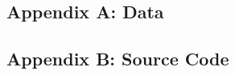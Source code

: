 \documentclass[a4paper]{article}
\begin{document}
\subsection{Appendix A: Data}

\subsection{Appendix B: Source Code}

%
%
%
%
%
%
%
\end{document}
